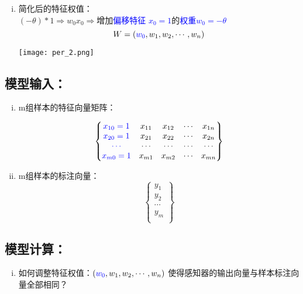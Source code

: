 \documentclass{article}
\begin{document}
\begin{CJK*}{UTF8}{gbsn}
\begin{enumerate}[(i)]
\item 简化后的特征权值：\\
 $(-\theta) * 1\Rightarrow w_{0}x_{0} \Rightarrow $增加\textcolor{blue}{偏移特征 $x_{0} = 1$}的\textcolor{blue}{权重$w_{0}=-\theta$}
$$W = \left(  \textcolor{blue}{ w_{0}},w_{1},w_{2},\cdots,w_{n}\right)$$

\texttt{[image: per\_2.png]}


\end{enumerate}


\subsection{模型输入：}
\begin{enumerate}[(i)]
\item m组样本的特征向量矩阵：

$$
 \left\{
 \begin{matrix}
  \textcolor{blue}{x_{10}= 1} &x_{11} & x_{12}  &\cdots & x_{1n}\\
  \textcolor{blue}{x_{20}= 1} &x_{21} & x_{22}  &\cdots & x_{2n}\\
  \textcolor{blue}{\cdots} &\cdots   & \cdots & \cdots  & \cdots  \\
  \textcolor{blue}{x_{m0}= 1} &x_{m1} & x_{m2}  &\cdots & x_{mn}\\
  \end{matrix}
  \right\}
$$

\item m组样本的标注向量：\\
$$
 \left\{
 \begin{matrix}
   y_{1} \\
   y_{2} \\
   \cdots \\
   y_{m} \\
  \end{matrix}
  \right\}
$$
\end{enumerate}

\subsection{模型计算：}

\begin{enumerate}[(i)]
\item 如何调整特征权值：$\left(\textcolor{blue}{ w_{0}},  w_{1},w_{2},\cdots ,w_{n}\right)$
使得感知器的输出向量与样本标注向量全部相同？


\end{enumerate}
\end{CJK*}
\end{document}
